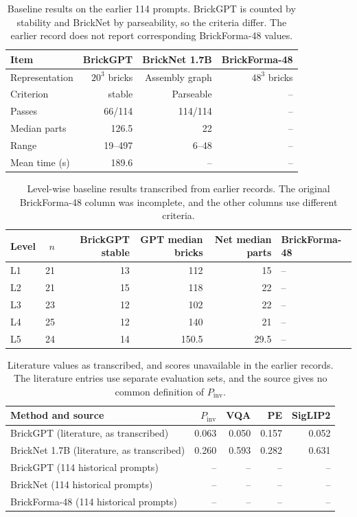 \begin{table}[!htbp]\centering\small
\begin{tabular}{lrrr}\toprule
Item & BrickGPT & BrickNet 1.7B & BrickForma-48 \\ \midrule
Representation & $20^3$ bricks & Assembly graph & $48^3$ bricks \\
Criterion & stable & Parseable & -- \\
Passes & 66/114 & 114/114 & -- \\
Median parts & 126.5 & 22 & -- \\
Range & 19--497 & 6--48 & -- \\
Mean time (s) & 189.6 & -- & -- \\
\bottomrule\end{tabular}
\caption{Baseline results on the earlier 114 prompts. BrickGPT is counted by stability and BrickNet by parseability, so the criteria differ. The earlier record does not report corresponding BrickForma-48 values.}
\end{table}

\begin{table}[!htbp]\centering\small
\begin{tabular}{lrrrrl}\toprule
Level & $n$ & BrickGPT stable & GPT median bricks & Net median parts & BrickForma-48 \\ \midrule
L1 & 21 & 13 & 112 & 15 & -- \\
L2 & 21 & 15 & 118 & 22 & -- \\
L3 & 23 & 12 & 102 & 22 & -- \\
L4 & 25 & 12 & 140 & 21 & -- \\
L5 & 24 & 14 & 150.5 & 29.5 & -- \\
\bottomrule\end{tabular}
\caption{Level-wise baseline results transcribed from earlier records. The original BrickForma-48 column was incomplete, and the other columns use different criteria.}
\end{table}

\begin{table}[!htbp]\centering\small
\begin{tabular}{lrrrr}\toprule
Method and source & $P_{\mathrm{inv}}$ & VQA & PE & SigLIP2 \\ \midrule
BrickGPT (literature, as transcribed) & 0.063 & 0.050 & 0.157 & 0.052 \\
BrickNet 1.7B (literature, as transcribed) & 0.260 & 0.593 & 0.282 & 0.631 \\
BrickGPT (114 historical prompts) & -- & -- & -- & -- \\
BrickNet (114 historical prompts) & -- & -- & -- & -- \\
BrickForma-48 (114 historical prompts) & -- & -- & -- & -- \\
\bottomrule\end{tabular}
\caption{Literature values as transcribed, and scores unavailable in the earlier records. The literature entries use separate evaluation sets, and the source gives no common definition of $P_{\mathrm{inv}}$.}
\end{table}

